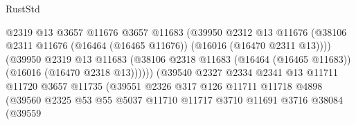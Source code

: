 \begin{lexlean}{RustStd}
\begin{coremodule}
                                          @2319
                                          @13
                                          @3657
                                          @11676
                                          @3657
                                          @11683
                                          (@39950
                                            @2312
                                            @13
                                            @11676
                                            (@38106
                                              @2311
                                              @11676
                                              (@16464 (@16465 @11676))
                                              (@16016 (@16470 @2311 @13))))
                                          (@39950
                                            @2319
                                            @13
                                            @11683
                                            (@38106
                                              @2318
                                              @11683
                                              (@16464 (@16465 @11683))
                                              (@16016 (@16470 @2318 @13))))))
                                      (@39540
                                        @2327
                                        @2334
                                        @2341
                                        @13
                                        @11711
                                        @11720
                                        @3657
                                        @11735
                                        (@39551
                                          @2326
                                          @317
                                          @126
                                          @11711
                                          @11718
                                          @4898
                                          (@39560
                                            @2325
                                            @53
                                            @55
                                            @5037
                                            @11710
                                            @11717
                                            @3710
                                            @11691
                                            @3716
                                            @38084
                                            (@39559

\end{coremodule}
\end{lexlean}
